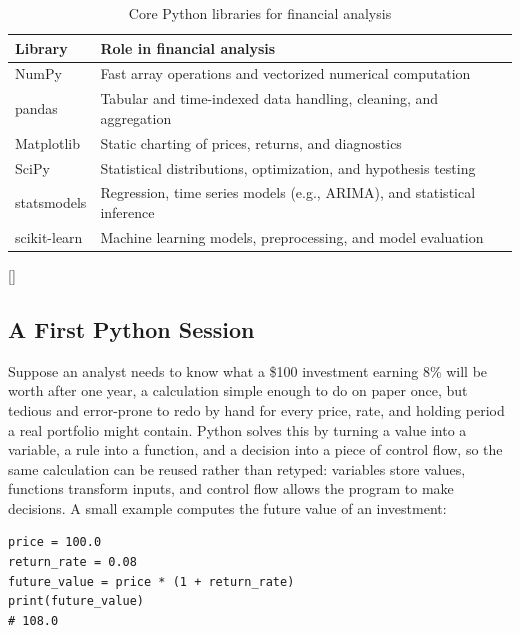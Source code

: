 \documentclass[../ai_in_finance]{subfiles}
\begin{document}
\begin{table}[htbp]
\centering
\begin{lrbox}{\bookmeasuredbox}
\begin{tabular}{p{2.6cm}p{9.5cm}}
\toprule
Library & Role in financial analysis \\
\midrule
NumPy & Fast array operations and vectorized numerical computation \\
pandas & Tabular and time-indexed data handling, cleaning, and aggregation \\
Matplotlib & Static charting of prices, returns, and diagnostics \\
SciPy & Statistical distributions, optimization, and hypothesis testing \\
statsmodels & Regression, time series models (e.g., ARIMA), and statistical inference \\
scikit-learn & Machine learning models, preprocessing, and model evaluation \\
\bottomrule
\end{tabular}
\end{lrbox}
\ifdim\wd\bookmeasuredbox<0.65\linewidth
\setlength{\bookcapwidth}{0.65\linewidth}
\else
\setlength{\bookcapwidth}{\wd\bookmeasuredbox}
\fi
{}[\bookcapwidth]{
\usebox{\bookmeasuredbox}
}{
\caption{Core Python libraries for financial analysis}
\label{tab:python_libs}
}
\end{table}

\subsection{A First Python Session}
\label{sec:first-session}

Suppose an analyst needs to know what a \$100 investment earning 8\% will be worth after one year, a calculation simple enough to do on paper once, but tedious and error-prone to redo by hand for every price, rate, and holding period a real portfolio might contain. Python solves this by turning a value into a variable, a rule into a function, and a decision into a piece of control flow, so the same calculation can be reused rather than retyped: variables store values, functions transform inputs, and control flow allows the program to make decisions. A small example computes the future value of an investment:

\begin{verbatim}
price = 100.0
return_rate = 0.08
future_value = price * (1 + return_rate)
print(future_value)
# 108.0
\end{verbatim}
\end{document}
